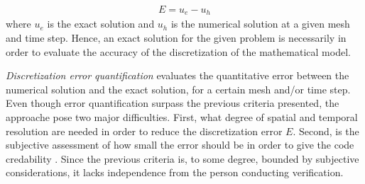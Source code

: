 \begin{align*}
E = u_e - u_h
\end{align*}
 where $u_e$ is the exact solution and $u_h$ is the numerical solution at a given mesh and time step. 
Hence, an exact solution for the given problem is necessarily in order to evaluate the accuracy of the discretization of the mathematical model. 
 

 
 
\textit{Discretization error quantification} evaluates the quantitative error between the numerical solution and the exact solution, for a certain mesh and/or time step. Even though error quantification surpass the previous criteria presented, the approache pose two major difficulties. First, what degree of spatial and temporal resolution are needed in order to reduce the discretization error $E$. Second, is the subjective assessment of how small the error should be in order to give the code credability \cite{Roache}. Since the previous criteria is, to some degree, bounded by subjective considerations, it lacks independence from the person conducting verification. \\

